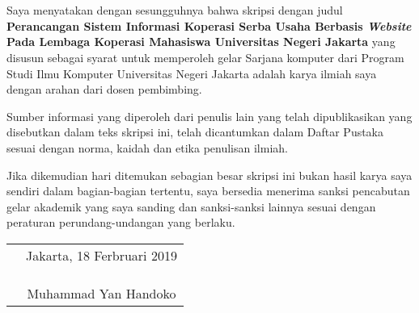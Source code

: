 \chapter*{}

Saya menyatakan dengan sesungguhnya bahwa skripsi dengan judul 	\textbf{Perancangan Sistem Informasi Koperasi Serba Usaha Berbasis \emph{Website} Pada Lembaga Koperasi Mahasiswa Universitas Negeri Jakarta} yang disusun sebagai syarat untuk memperoleh gelar Sarjana komputer dari Program Studi Ilmu Komputer Universitas Negeri Jakarta adalah karya ilmiah saya dengan arahan dari dosen pembimbing.

Sumber informasi yang diperoleh dari penulis lain yang
telah dipublikasikan yang disebutkan dalam teks skripsi ini, telah dicantumkan dalam Daftar Pustaka sesuai dengan norma, kaidah dan etika penulisan ilmiah.

Jika dikemudian hari ditemukan sebagian besar skripsi ini bukan hasil karya saya sendiri dalam bagian-bagian tertentu, saya bersedia menerima sanksi pencabutan gelar akademik yang saya sanding dan sanksi-sanksi lainnya sesuai dengan peraturan perundang-undangan yang berlaku.

\vspace{.5cm}

\begin{tabular}{p{7.5cm}c}
	&Jakarta, 18 Ferbruari 2019\\
	&\\
	&\\
	&\\
	&Muhammad Yan Handoko
\end{tabular}